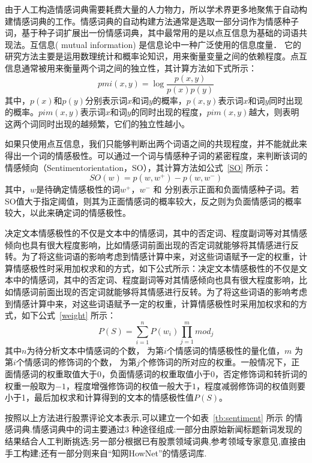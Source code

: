 \documentclass[cs4size,a4paper]{ctexart}
\numberwithin{equation}{section}
\numberwithin{table}{section}
\numberwithin{figure}{section}
\begin{document}
由于人工构造情感词典需要耗费大量的人力物力，所以学术界更多地聚焦于自动构建情感词典的工作。情感词典的自动构建方法通常是选取一部分词作为情感种子词，基于种子词扩展出一份情感词典，其中最常用的是以点互信息为基础的词语共现法。互信息( mutual information) 是信息论中一种广泛使用的信息度量． 它的研究方法主要是运用数理统计和概率论知识，用来衡量变量之间的依赖程度。点互信息通常被用来衡量两个词之间的独立性，其计算方法如下式所示：
\begin{equation}\label{pmi}
  pmi(x,y) = \log \frac{p(x,y)}{p(x)p(y)}
\end{equation}
其中，$p(x)$和$p(y)$分别表示词$x$和词$y$的概率，$p(x,y)$表示词$x$和词$y$同时出现的概率。$pim(x,y)$表示词$x$和词$y$的同时出现的程度，$pim(x,y)$越大，则表明这两个词同时出现的越频繁，它们的独立性越小。

如果只使用点互信息，我们只能够判断出两个词语之间的共现程度，并不能就此来得出一个词的情感极性。可以通过一个词与情感种子词的紧密程度，来判断该词的情感倾向（Sentimentorientation，SO），其计算方法如公式~\ref{SO} 所示：
\begin{equation}\label{SO}
  SO(w) = p(w,w^{+})-p(w,w^-)
\end{equation}
其中，$w$是待确定情感极性的词$w^{+}$，$w^-$ 和 分别表示正面和负面情感种子词。若SO值大于指定阈值，则其为正面情感词的概率较大，反之则为负面情感词的概率较大，以此来确定词的情感极性。

决定文本情感极性的不仅是文本中的情感词，其中的否定词、程度副词等对其情感倾向也具有很大程度影响，比如情感词前面出现的否定词就能够将其情感进行反转。为了将这些词语的影响考虑到情感计算中来，对这些词语赋予一定的权重，计算情感极性时采用加权求和的方式，如下公式所示：决定文本情感极性的不仅是文本中的情感词，其中的否定词、程度副词等对其情感倾向也具有很大程度影响，比如情感词前面出现的否定词就能够将其情感进行反转。为了将这些词语的影响考虑到情感计算中来，对这些词语赋予一定的权重，计算情感极性时采用加权求和的方式，如下公式~\ref{weight} 所示：
\begin{equation}\label{weight}
  P(S) = \sum_{i=1}^{n}P(w_i)\prod_{j=1}^{m}mod_j
\end{equation}
其中$n$为待分析文本中情感词的个数， 为第$i$个情感词的情感极性的量化值，$m$ 为第$i$个情感词的修饰词的个数， 为第$j$个修饰词的所对应的权重。一般情况下，正面情感词的权重取值大于$0$，负面情感词的权重取值小于$0$，否定修饰词和转折词的权重一般取为$-1$，程度增强修饰词的权值一般大于$1$，程度减弱修饰词的权值则要小于1，最后加权求和计算得到的文本的情感极性值$P(S)$。

按照以上方法进行股票评论文本表示,可以建立一个如表~\ref{tb:sentiment} 所示 的情感词典.情感词典中的词主要通过3 种途径组成:一部分由原始新闻标题新词发现的结果结合人工判断挑选;另一部分根据已有股票领域词典,参考领域专家意见,直接由手工构建;还有一部分则来自“知网HowNet”的情感词库.
\end{document}
